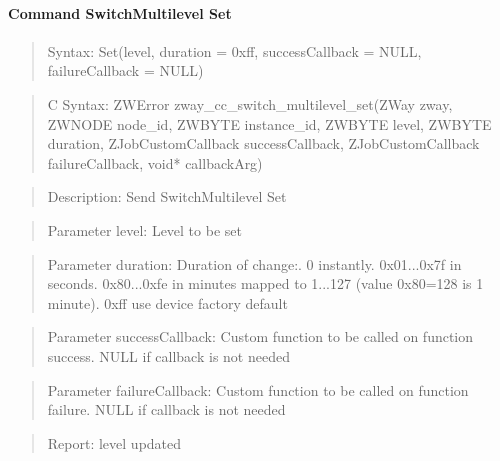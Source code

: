 \paragraph{Command SwitchMultilevel Set}
\begin{quote}Syntax: Set(level, duration = 0xff, successCallback = NULL, failureCallback = NULL)\end{quote}
\begin{quote}C Syntax: ZWError zway\_cc\_switch\_multilevel\_set(ZWay zway, ZWNODE node\_id, ZWBYTE instance\_id, ZWBYTE level, ZWBYTE duration, ZJobCustomCallback successCallback, ZJobCustomCallback failureCallback, void* callbackArg)\end{quote}
\begin{quote}Description: Send SwitchMultilevel Set\end{quote}
\begin{quote}Parameter level: Level to be set\end{quote}
\begin{quote}Parameter duration: Duration of change:. 0 instantly. 0x01...0x7f in seconds. 0x80...0xfe in minutes mapped to 1...127 (value 0x80=128 is 1 minute). 0xff use device factory default\end{quote}
\begin{quote}Parameter successCallback: Custom function to be called on function success. NULL if callback is not needed\end{quote}
\begin{quote}Parameter failureCallback: Custom function to be called on function failure. NULL if callback is not needed\end{quote}
\begin{quote}Report: level updated\end{quote}

